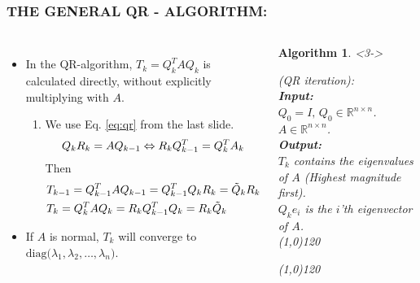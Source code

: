 \documentclass[a4paper,8pt]{beamer} %
\newcommand{\diag}[1]{\text{diag}{#1}}
\newtheorem{algo}{Algorithm}%
\begin{document}
\begin{frame}%
\frametitle{THE GENERAL QR - ALGORITHM:}
\begin{columns}
%
%
\column{7cm}
\begin{itemize}
\item <1->
	In the QR-algorithm, $T_k=Q_k^TAQ_k$ is calculated directly, without explicitly multiplying with $A$.
	\begin{enumerate}
		\item[]
			We use Eq. \eqref{eq:qr} from the last slide.
			\begin{equation}
				Q_kR_k = AQ_{k-1} \Leftrightarrow R_kQ^T_{k-1} = Q_k^TA_k \notag\label{eq824_1} 
			\end{equation}
			Then
			\begin{align}
				&T_{k-1} = Q_{k-1}^T A Q_{k-1}  = Q_{k-1}^T Q_{k} R_{k} = \tilde Q_k R_k\label{eq824_2} \\
				&T_k = Q_k^T A Q_{k}  = R_k Q_{k-1}^T Q_{k} = R_k \tilde Q_k 	\notag\label{eq824_3} 
			\end{align}
	\end{enumerate}
\item <2-> If $A$ is normal, $T_k$ will converge to $\diag(\lambda_1,\lambda_2,\dots,\lambda_n)$.
\end{itemize}	

\column{5cm}
%
%
\begin{algo} <3->
\begin{footnotesize}
{
%
	(QR iteration):
%
}\\
\textbf{Input: }
{
%
	\\$Q_0=I,\,Q_0\in\mathbb R^{n\times n}$.
	\\$A\in\mathbb R^{n\times n}$.
%
}\\
\textbf{Output: }
{
%
	\\$T_k$ contains the eigenvalues of $A$ (Highest magnitude first). 
	\\$Q_ke_i$ is the $i$'th eigenvector of $A$.
%
}\\
\line(1,0){120}
\begin{algorithmic}
%
\EndFor{}
%
\end{algorithmic}
\line(1,0){120}
\label{algQRIterSimple}
\end{footnotesize}
\end{algo}
%
%

\end{columns}
\end{frame} %
\end{document}
